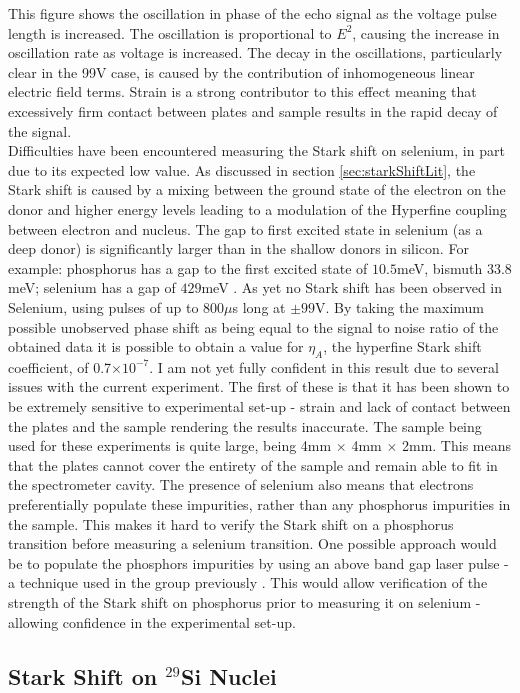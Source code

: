 This figure shows the oscillation in phase of the echo signal as the voltage pulse length is increased.
The oscillation is proportional to $E^2$, causing the increase in oscillation rate as voltage is increased.
The decay in the oscillations, particularly clear in the 99V case, is caused by the contribution of inhomogeneous linear electric field terms.
Strain is a strong contributor to this effect meaning that excessively firm contact between plates and sample results in the rapid decay of the signal.
\\
Difficulties have been encountered measuring the Stark shift on selenium, in part due to its expected low value.
As discussed in section \ref{sec:starkShiftLit}, the Stark shift is caused by a mixing between the ground state of the electron on the donor and higher energy levels leading to a modulation of the Hyperfine coupling between electron and nucleus.
The gap to first excited state in selenium (as a deep donor) is significantly larger than in the shallow donors in silicon. 
For example: phosphorus has a gap to the first excited state of $10.5$meV, bismuth $33.8$meV; selenium has a gap of $429$meV \cite{LoNardo2015,Nardo2015}. 
As yet no Stark shift has been observed in Selenium, using pulses of up to 800$\mu$s long at $\pm99$V.
By taking the maximum possible unobserved phase shift as being equal to the signal to noise ratio of the obtained data it is possible to obtain a value for $\eta_A$, the hyperfine Stark shift coefficient, of 0.7$\times10^{-7}$.
I am not yet fully confident in this result due to several issues with the current experiment.
The first of these is that it has been shown to be extremely sensitive to experimental set-up - strain and lack of contact between the plates and the sample rendering the results inaccurate.
The sample being used for these experiments is quite large, being 4mm $\times$ 4mm $\times$ 2mm.
This means that the plates cannot cover the entirety of the sample and remain able to fit in the spectrometer cavity.
The presence of selenium also means that electrons preferentially populate these impurities, rather than any phosphorus impurities in the sample.
This makes it hard to verify the Stark shift on a phosphorus transition before measuring a selenium transition.
One possible approach would be to populate the phosphors impurities by using an above band gap laser pulse - a technique used in the group previously \cite{Nardo2015}.
This would allow verification of the strength of the Stark shift on phosphorus prior to measuring it on selenium - allowing confidence in the experimental set-up.

\subsection{Stark Shift on $^{29}$Si Nuclei}
